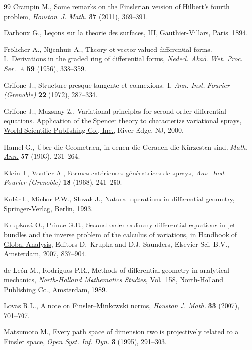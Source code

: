 \documentclass[11pt]{article}
\numberwithin{equation}{section}
\begin{document}
\begin{thebibliography}{99}
Crampin M.,
Some remarks on the Finslerian version of Hilbert's fourth problem,
{\it Houston~J. Math.}   {\bf 37} (2011), 369--391.

Darboux G.,
Le\c cons sur la theorie des surfaces, III,
Gauthier-Villars, Paris, 1894.

Fr\"olicher A., Nijenhuis A.,
Theory ot vector-valued dif\/ferential forms. I.~Derivations in the graded ring of dif\/ferential forms,
{\it Nederl. Akad. Wet. Proc. Ser.~A} {\bf 59} (1956), 338--359.

Grifone J.,
Structure presque-tangente et connexions.~I,
{\it Ann. Inst. Fourier (Grenoble)} {\bf 22}  (1972), 287--334.

Grifone J., Muzsnay Z.,
Variational principles for second-order dif\/ferential equations. Application of the Spencer theory to characterize variational sprays,
\href{http://dx.doi.org/10.1142/9789812813596}{World Scientif\/ic Publishing Co., Inc.}, River Edge, NJ, 2000.

Hamel G.,
\"Uber die Geometrien, in denen die Geraden die K\"urzesten sind,
\href{http://dx.doi.org/10.1007/BF01444348}{{\it Math. Ann.}} {\bf 57} (1903), 231--264.

Klein J.,  Voutier A.,
Formes ext\'erieures g\'en\'eratrices de sprays,
{\it Ann. Inst. Fourier (Grenoble)} {\bf 18} (1968), 241--260.

Kol\'ar I., Michor P.W., Slovak J.,
Natural operations in dif\/ferential geometry,
Springer-Verlag, Berlin, 1993.

Krupkov\'a O., Prince G.E.,
Second order ordinary dif\/ferential equations in jet bundles and the inverse  problem of the calculus of variations,
 in \href{http://dx.doi.org/10.1016/B978-044452833-9.50017-6}{Handbook of Global Analysis}, Editors D.~Krupka and D.J. Saunders,   Elsevier Sci. B.V., Amsterdam,  2007, 837--904.

de Le\'on M., Rodrigues P.R.,
Methods of dif\/ferential geometry in analytical mechanics,
{\it North-Holland Mathematics Studies}, Vol.~158, North-Holland Publishing Co., Amsterdam, 1989.

Lovas R.L.,
A note on Finsler--Minkowski norms,
{\it Houston J. Math.}  {\bf 33} (2007), 701--707.

Matsumoto M.,
Every path space of dimension two is projectively related to a Finsler space,
\href{http://dx.doi.org/10.1007/BF02228993}{{\it Open Syst. Inf. Dyn.}} {\bf 3} (1995), 291--303.


\end{thebibliography}
\end{document}
